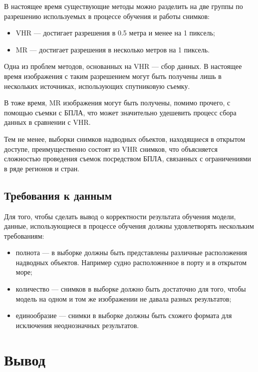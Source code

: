 В настоящее время существующие методы можно разделить на две группы по разрешению используемых в процессе обучения и работы снимков:

\begin{itemize}[label=---]
    \item VHR --- достигает разрешения в 0.5 метра и менее на 1 пиксель;
    \item MR --- достигает разрешения в несколько метров на 1 пиксель.
\end{itemize}

Одна из проблем методов, основанных на VHR --- сбор данных. В настоящее время изображения с таким разрешением могут быть получены лишь в нескольких источниках, использующих спутниковую съемку.

В тоже время, MR изображения могут быть получены, помимо прочего, с помощью съемки с БПЛА, что может значительно удешевить процесс сбора данных в сравнении с VHR.

Тем не менее, выборки снимков надводных объектов, находящиеся в открытом доступе, преимущественно состоят из VHR снимков, что объясняется сложностью проведения съемок посредством БПЛА, связанных с ограничениями в ряде регионов и стран.

\subsection{Требования к данным}

Для того, чтобы сделать вывод о корректности результата обучения модели, данные, использующиеся в процессе обучения должны удовлетворять нескольким требованиям:
\begin{itemize}[label=---]
    \item полнота --- в выборке должны быть представлены различные расположения надводных объектов. Например судно расположенное в порту и в открытом море;
    \item количество --- снимков в выборке должно быть достаточно для того, чтобы модель на одном и том же изображении не давала разных результатов;
    \item единообразие --- снимки в выборке должны быть схожего формата для исключения неоднозначных результатов.
\end{itemize}

\section{Вывод}